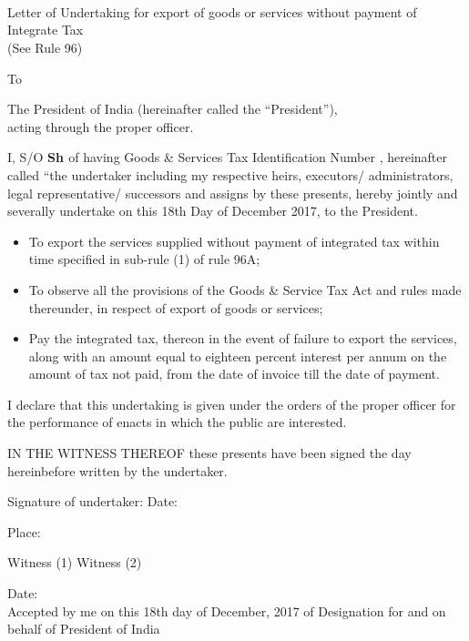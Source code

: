 \documentclass[a4paper,11pt] {report}
\begin{document}
\vspace*{2cm}\\
\\
\\

\begin{center}
  Letter of Undertaking for export of goods or services without payment of Integrate Tax \\
  (See Rule 96)
\end{center}
To

The President of India (hereinafter called the “President”),\\
acting through the proper officer.
\bigbreak

I, {\bf{\myname}} S/O {\bf{Sh \myfathersname}} of
\underline{\myaddress} having Goods & Services Tax Identification
Number \underline{\mygstin}, hereinafter called “the undertaker
including my respective heirs, executors/ administrators, legal
representative/ successors and assigns by these presents, hereby
jointly and severally undertake on this 18th Day of December 2017, to
the President.

\begin{itemize}
\item To export the services supplied without payment of integrated
  tax within time specified in sub-rule (1) of rule 96A;
\item To observe all the provisions of the Goods & Service Tax Act and
  rules made thereunder, in respect of export of goods or services;
\item Pay the integrated tax, thereon in the event of failure to
  export the services, along with an amount equal to eighteen percent
  interest per annum on the amount of tax not paid, from the date of
  invoice till the date of payment.
\end{itemize}

I declare that this undertaking is given under the orders of the
proper officer for the performance of enacts in which the public are
interested. 

IN THE WITNESS THEREOF these presents have been signed
the day hereinbefore written by the undertaker.

Signature of undertaker:
\bigbreak
\bigbreak
Date: \DayAfter[0]

Place: \myplace

Witness (1) \hfill Witness (2)
\bigbreak
\bigbreak
\bigbreak

Date: \DayAfter[0]
\\Accepted by me on this 18th day of December, 2017 of Designation for and on behalf of President of India
\end{document}
